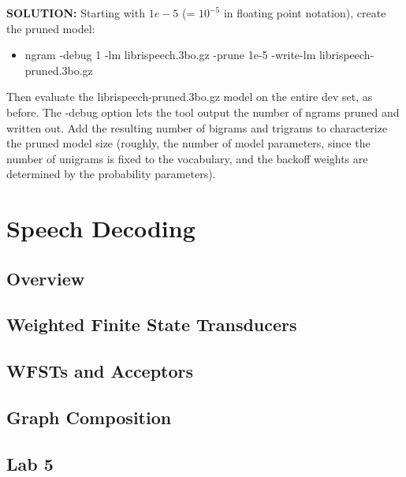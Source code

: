 {\bf SOLUTION:} Starting with $1e-5$ (= $10^{-5}$ in floating point notation), create the pruned model:
\begin{itemize}
	\item ngram -debug 1 -lm librispeech.3bo.gz -prune 1e-5 -write-lm librispeech-pruned.3bo.gz
\end{itemize}

Then evaluate the librispeech-pruned.3bo.gz model on the entire dev set, as before. The -debug option lets the tool output the number of ngrams pruned and written out. Add the resulting number of bigrams and trigrams to characterize the pruned model size (roughly, the number of model parameters, since the number of unigrams is fixed to the vocabulary, and the backoff weights are determined by the probability parameters).











\section{Speech Decoding}
\subsection{Overview}

\subsection{Weighted Finite State Transducers}

\subsection{WFSTs and Acceptors}

\subsection{Graph Composition}

\subsection{Lab 5}


